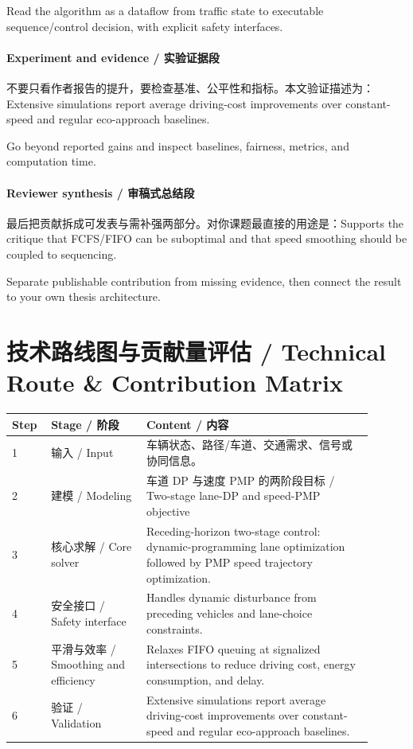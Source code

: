 \documentclass[UTF8,a4paper,11pt,fontset=fandol]{ctexart}
\begin{document}
Read the algorithm as a dataflow from traffic state to executable sequence/control decision, with explicit safety interfaces.

\paragraph{Experiment and evidence / 实验证据段}不要只看作者报告的提升，要检查基准、公平性和指标。本文验证描述为：Extensive simulations report average driving-cost improvements over constant-speed and regular eco-approach baselines.

Go beyond reported gains and inspect baselines, fairness, metrics, and computation time.

\paragraph{Reviewer synthesis / 审稿式总结段}最后把贡献拆成可发表与需补强两部分。对你课题最直接的用途是：Supports the critique that FCFS/FIFO can be suboptimal and that speed smoothing should be coupled to sequencing.

Separate publishable contribution from missing evidence, then connect the result to your own thesis architecture.


\section{技术路线图与贡献量评估 / Technical Route \& Contribution Matrix}
\begin{longtable}{p{0.08\linewidth}p{0.24\linewidth}p{0.58\linewidth}}
\toprule
Step & Stage / 阶段 & Content / 内容\\
\midrule
1 & 输入 / Input & 车辆状态、路径/车道、交通需求、信号或协同信息。 \\
2 & 建模 / Modeling & 车道 DP 与速度 PMP 的两阶段目标 / Two-stage lane-DP and speed-PMP objective \\
3 & 核心求解 / Core solver & Receding-horizon two-stage control: dynamic-programming lane optimization followed by PMP speed trajectory optimization. \\
4 & 安全接口 / Safety interface & Handles dynamic disturbance from preceding vehicles and lane-choice constraints. \\
5 & 平滑与效率 / Smoothing and efficiency & Relaxes FIFO queuing at signalized intersections to reduce driving cost, energy consumption, and delay. \\
6 & 验证 / Validation & Extensive simulations report average driving-cost improvements over constant-speed and regular eco-approach baselines. \\
\bottomrule
\end{longtable}
\end{document}

